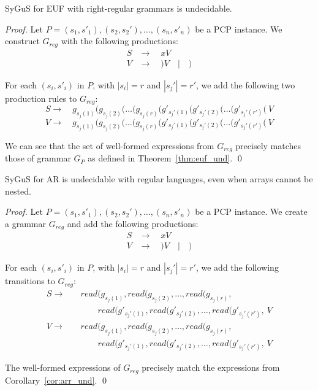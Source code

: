 \begin{corollary}
SyGuS for EUF with right-regular grammars is undecidable.
\end{corollary}
\begin{proof}
Let $P = (s_1,s'_1), (s_2,s_2'),\dots,(s_n,s'_n)$ be a PCP instance. 
We construct $G_{reg}$ with the following productions:
\begin{align*}
S &\rightarrow \quad xV \\
V &\rightarrow \quad )V \quad | \quad )
\end{align*}

For each $(s_i, s'_i)$ in $P$, with $|s_i|=r$ and $|s_j'|=r'$, we add the following two production rules to $G_{reg}$:
\[
S\rightarrow \quad g_{s_j(1)}(g_{s_j(2)}(\dots(g_{s_j(r)}(g'_{s_j'(1)}(g'_{s_j'(2)}(\dots(g'_{s_j'(r')}(\ V
\]
\[
V\rightarrow \quad g_{s_j(1)}(g_{s_j(2)}(\dots(g_{s_j(r)}(g'_{s_j'(1)}(g'_{s_j'(2)}(\dots(g'_{s_j'(r')}(\ V
\]


We can see that the set of well-formed expressions from $G_{reg}$ precisely matches those of grammar $G_P$ as defined in Theorem~\ref{thm:euf_und}. \qed
\end{proof}




\begin{corollary}
    SyGuS for AR is undecidable with regular languages, even when arrays cannot be nested.
\end{corollary}
\begin{proof}
Let $P = (s_1,s'_1), (s_2,s_2'),\dots ,(s_n,s'_n)$ be a PCP instance. We create a grammar $G_{reg}$ and add the following productions:
\begin{align*}
S &\rightarrow \quad xV \\
V &\rightarrow \quad )V \quad | \quad )
\end{align*}

\renewcommand{\read}[0]{\mathit{read}}

For each $(s_i, s'_i)$ in $P$, with $|s_i|=r$ and $|s_j'|=r'$, we add the following transitions to $G_{reg}$: 
\[
\begin{array}{rl}
S\rightarrow  \quad 
& \read(g_{s_j(1)},\read (g_{s_j(2)}, \dots, \read(g_{s_j(r)}, \\ 
& \qquad \read(g'_{s_j'(1)},\read(g'_{s_j'(2)},\dots,\read(g'_{s_j'(r')},\ V \\
V\rightarrow  \quad 
& \read(g_{s_j(1)},\read (g_{s_j(2)}, \dots, \read(g_{s_j(r)}, \\ 
& \qquad \read(g'_{s_j'(1)},\read(g'_{s_j'(2)},\dots,\read(g'_{s_j'(r')},\ V 
\end{array}
\]


The well-formed expressions of $G_{reg}$ precisely match the expressions from Corollary~\ref{cor:arr_und}. 
\qed
\end{proof}




